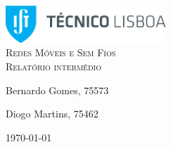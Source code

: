\begin{titlepage}

	\begin{center}

		\includegraphics[width=6cm]{./title}\\[3cm]

		\textsc{\LARGE Redes Móveis e Sem Fios}\\[1.5cm]

		\textsc{\Large Relatório intermédio}\\[1.5cm]


		


		\noindent
		\begin{minipage}{0.4\textwidth}
			\begin{flushleft} \large
				Bernardo Gomes, 75573
			\end{flushleft}
		\end{minipage}
		\begin{minipage}{0.4\textwidth}
			\begin{flushright} \large
				Diogo Martins, 75462
			\end{flushright}
		\end{minipage}

		\vfill

		{\large \today}


	\end{center}

\end{titlepage}